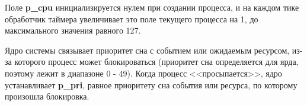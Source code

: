 Поле \textbf{p\_cpu} инициализируется нулем при создании процесса, и на каждом тике обработчик таймера увеличивает это поле текущего процесса на 1, до максимального значения равного 127.

Ядро системы связывает приоритет сна с событием или ожидаемым ресурсом, из-за которого процесс может блокироваться (приоритет сна определяется для ярда, поэтому лежит в диапазоне 0 - 49). Когда процесс <<просыпается>>, ядро устанавливает \textbf{p\_pri}, равное приоритету сна события или ресурса, по которому произошла блокировка.




